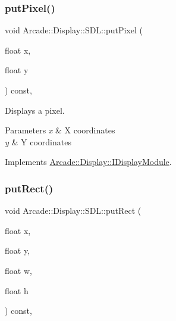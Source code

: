 \mbox{\label{classArcade_1_1Display_1_1SDL_a5c3f965b3394c9654f3537cab1201c1c}} 
\subsubsection{\texorpdfstring{putPixel()}{putPixel()}}
{\footnotesize\ttfamily void Arcade\+::\+Display\+::\+S\+D\+L\+::put\+Pixel (\begin{DoxyParamCaption}\item[{float}]{x,  }\item[{float}]{y }\end{DoxyParamCaption}) const\hspace{0.3cm}{\ttfamily [final]}, {\ttfamily [virtual]}}



Displays a pixel. 


\begin{DoxyParams}{Parameters}
{\em x} & X coordinates \\
\hline
{\em y} & Y coordinates \\
\hline
\end{DoxyParams}


Implements \mbox{\hyperlink{classArcade_1_1Display_1_1IDisplayModule_a86a61eaa1d0cf2ddfdedbaa04054da90}{Arcade\+::\+Display\+::\+I\+Display\+Module}}.

\mbox{\label{classArcade_1_1Display_1_1SDL_a81a7dc1e2ec20a453ca12d24b079968e}} 
\subsubsection{\texorpdfstring{putRect()}{putRect()}}
{\footnotesize\ttfamily void Arcade\+::\+Display\+::\+S\+D\+L\+::put\+Rect (\begin{DoxyParamCaption}\item[{float}]{x,  }\item[{float}]{y,  }\item[{float}]{w,  }\item[{float}]{h }\end{DoxyParamCaption}) const\hspace{0.3cm}{\ttfamily [final]}, {\ttfamily [virtual]}}



